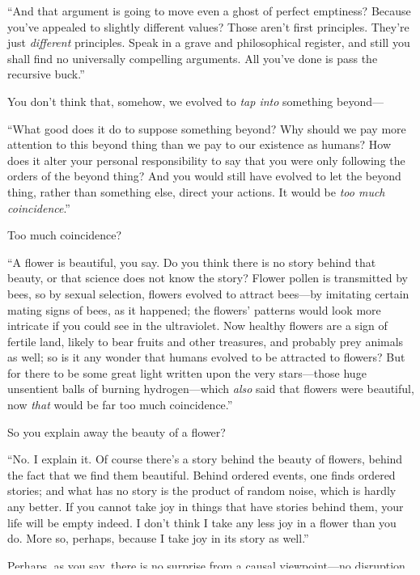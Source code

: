 {
 ``And that argument is going to move even a ghost
of perfect emptiness? Because you've appealed to
slightly different values? Those aren't first
principles. They're just \textit{different} principles.
Speak in a grave and philosophical register, and still you shall find
no universally compelling arguments. All you've done is
pass the recursive buck.''}

{
 You don't think that, somehow, we evolved to
\textit{tap into} something beyond---}

{
 ``What good does it do to suppose something
beyond? Why should we pay more attention to this beyond thing than we
pay to our existence as humans? How does it alter your personal
responsibility to say that you were only following the orders of the
beyond thing? And you would still have evolved to let the beyond thing,
rather than something else, direct your actions. It would be
\textit{too much coincidence}.''}

{
 Too much coincidence?}

{
 ``A flower is beautiful, you say. Do you think
there is no story behind that beauty, or that science does not know the
story? Flower pollen is transmitted by bees, so by sexual selection,
flowers evolved to attract bees---by imitating certain mating signs of
bees, as it happened; the flowers' patterns would look
more intricate if you could see in the ultraviolet. Now healthy flowers
are a sign of fertile land, likely to bear fruits and other treasures,
and probably prey animals as well; so is it any wonder that humans
evolved to be attracted to flowers? But for there to be some great
light written upon the very stars---those huge unsentient balls of
burning hydrogen---which \textit{also} said that flowers were
beautiful, now \textit{that} would be far too much
coincidence.''}

{
 So you explain away the beauty of a flower?}

{
 ``No. I explain it. Of course
there's a story behind the beauty of flowers, behind
the fact that we find them beautiful. Behind ordered events, one finds
ordered stories; and what has no story is the product of random noise,
which is hardly any better. If you cannot take joy in things that have
stories behind them, your life will be empty indeed. I
don't think I take any less joy in a flower than you
do. More so, perhaps, because I take joy in its story as
well.''}

{
 Perhaps, as you say, there is no surprise from a causal
viewpoint---no disruption of the physical order of the universe. But it
still seems to me that, in this creation of humans by evolution,
something happened that is precious and marvelous and wonderful. If we
cannot call it a physical miracle, then call it a moral miracle.}

